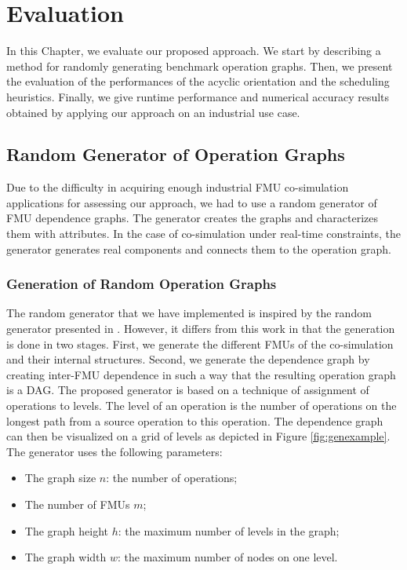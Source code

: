 \chapter{\label{ch:6-eval}Evaluation}

\minitoc

In this Chapter, we evaluate our proposed approach. We start by describing a method for randomly generating benchmark operation graphs. Then, we present the evaluation of the performances of the acyclic orientation and the scheduling heuristics. Finally, we give runtime performance and numerical accuracy results obtained by applying our approach on an industrial use case.

\section{Random Generator of Operation Graphs}

Due to the difficulty in acquiring enough industrial FMU co-simulation applications for assessing our approach, we had to use a random generator of FMU dependence graphs. The generator creates the graphs and characterizes them with attributes. In the case of co-simulation under real-time constraints, the generator generates real components and connects them to the operation graph.

\subsection{Generation of Random Operation Graphs}

The random generator that we have implemented is inspired by the random generator presented in \cite{kalla:2004}. However, it differs from this work in that the generation is done in two stages. First, we generate the different FMUs of the co-simulation and their internal structures. Second, we generate the dependence graph by creating inter-FMU dependence in such a way that the resulting operation graph is a DAG. The proposed generator is based on a technique of assignment of operations to levels. The level of an operation is the number of operations on the longest path from a source operation to this operation. The dependence graph can then be visualized on a grid of levels as depicted in Figure \ref{fig:genexample}. The generator uses the following parameters:

\begin{itemize}
\item The graph size $n$: the number of operations;
\item The number of FMUs $m$;
\item The graph height $h$: the maximum number of levels in the graph;
\item The graph width $w$: the maximum number of nodes on one level.
\end{itemize}

